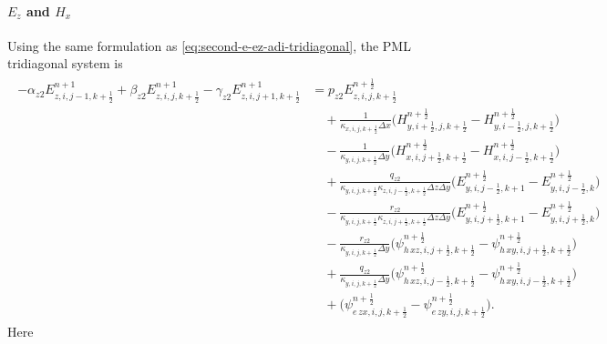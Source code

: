 \documentclass{article}
\numberwithin{equation}{section}
\numberwithin{figure}{section}
\begin{document}
\paragraph{$E_z$ and $H_x$}
Using the same formulation as \eqref{eq:second-e-ez-adi-tridiagonal}, the PML tridiagonal system is
\begin{align}
    \begin{split}
        -\alpha_{z2}E_{z,i,j-1,k+\tfrac12}^{n+1} + \beta_{z2}E_{z,i,j,k+\tfrac12}^{n+1} - \gamma_{z2}E_{z,i,j+1,k+\tfrac12}^{n+1}
         & = p_{z2}E_{z,i,j,k+\tfrac12}^{n+\frac12}                                                                                                                                       \\
         & \quad +\frac{1}{\kappa_{x,i,j,k+\tfrac12}\Delta x}\Big(H_{y,i+\tfrac12,j,k+\tfrac12}^{n+\frac12}-H_{y,i-\tfrac12,j,k+\tfrac12}^{n+\frac12}\Big)                                \\
         & \quad -\frac{1}{\kappa_{y,i,j,k+\tfrac12}\Delta y}\Big(H_{x,i,j+\tfrac12,k+\tfrac12}^{n+\frac12}-H_{x,i,j-\tfrac12,k+\tfrac12}^{n+\frac12}\Big)                                \\
         & \quad +\frac{q_{z2}}{\kappa_{y,i,j,k+\tfrac12}\kappa_{z,i,j-\tfrac12,k+\tfrac12}\Delta z\Delta y}\Big(E_{y,i,j-\tfrac12,k+1}^{n+\frac12}-E_{y,i,j-\tfrac12,k}^{n+\frac12}\Big) \\
         & \quad -\frac{r_{z2}}{\kappa_{y,i,j,k+\tfrac12}\kappa_{z,i,j+\tfrac12,k+\tfrac12}\Delta z\Delta y}\Big(E_{y,i,j+\tfrac12,k+1}^{n+\frac12}-E_{y,i,j+\tfrac12,k}^{n+\frac12}\Big) \\
         & \quad -\frac{r_{z2}}{\kappa_{y,i,j,k+\tfrac12}\Delta y}\Big(\psi^{n+\frac12}_{h\,xz,i,j+\tfrac12,k+\tfrac12} - \psi^{n+\frac12}_{h\,xy,i,j+\tfrac12,k+\tfrac12}\Big)           \\
         & \quad +\frac{q_{z2}}{\kappa_{y,i,j,k+\tfrac12}\Delta y}\Big(\psi^{n+\frac12}_{h\,xz,i,j-\tfrac12,k+\tfrac12} - \psi^{n+\frac12}_{h\,xy,i,j-\tfrac12,k+\tfrac12}\Big)           \\
         & \quad +\Big(\psi^{n+\frac12}_{e\,zx,i,j,k+\tfrac12}-\psi^{n+\frac12}_{e\,zy,i,j,k+\tfrac12}\Big).
    \end{split}
    \label{eq:second-e-ez-pml-adi-tridiagonal}
\end{align}
Here
\end{document}
